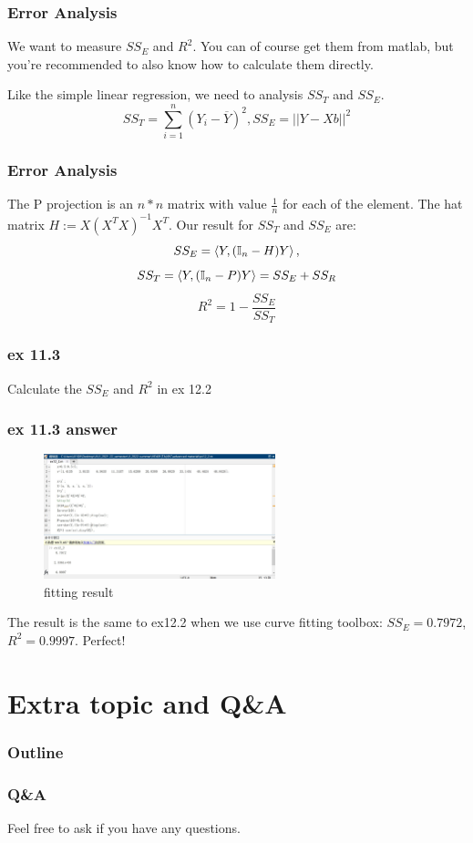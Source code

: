 \documentclass{beamer}
\begin{document}
\begin{frame}
    \frametitle{Error Analysis}

    We want to measure $SS_{E}$ and $R^2$. You can of course get them from matlab, but you're recommended to also know how to calculate them directly.\par
    Like the simple linear regression, we need to analysis $SS_{T}$ and $SS_{E}$.
    \[SS_{T}=\sum\limits_{i=1}^{n}(Y_i-\overline{Y})^2, SS_{E}=||Y-Xb||^2\]


\end{frame}

\begin{frame}
    \frametitle{Error Analysis}

    The P projection is an $n*n$ matrix with value $\frac{1}{n}$ for each of the element. The hat matrix $H:=X(X^{T}X)^{-1}X^{T}$. Our result for $SS_{T}$ and $SS_{E}$ are:
    \[SS_{E}=\Braket{Y, (\mathbb{I}_{n}-H)Y}, \]
    \[SS_{T}=\Braket{Y,(\mathbb{I}_{n}-P)Y}=SS_{E}+SS_{R}\]
    \[R^2=1-\frac{SS_{E}}{SS_{T}}\]

\end{frame}

\begin{frame}
    \frametitle{ex 11.3}

    Calculate the $SS_E$ and $R^2$ in ex 12.2

\end{frame}

\begin{frame}
    \frametitle{ex 11.3 answer}

    \begin{figure}[H]
        \centering
        \includegraphics[width=0.6\textwidth,height=0.3\textwidth]{ex12_3.jpg}
        \caption{fitting result}
    \end{figure}\par
    The result is the same to ex12.2 when we use curve fitting toolbox: $SS_{E}=0.7972$, $R^2=0.9997$. Perfect!

\end{frame}



\section{Extra topic and Q\&A}
\begin{frame}
    \frametitle{Outline}
    \tableofcontents[currentsection]
\end{frame}

\begin{frame}
    \frametitle{Q\&A}
    
    Feel free to ask if you have any questions.\par
    
    
    
\end{frame}
\end{document}
